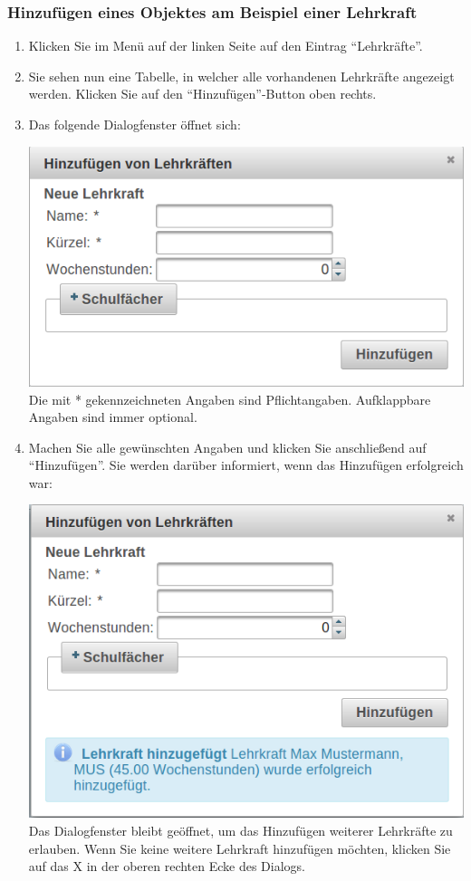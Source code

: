 \documentclass[fontsize=12pt]{scrartcl}
\begin{document}
\subsubsection{Hinzufügen eines Objektes am Beispiel einer Lehrkraft}
\begin{enumerate}
\item Klicken Sie im Menü auf der linken Seite auf den Eintrag "`Lehrkräfte"'.
\item Sie sehen nun eine Tabelle, in welcher alle vorhandenen Lehrkräfte angezeigt werden. Klicken Sie auf den "`Hinzufügen"'-Button oben rechts.
\item Das folgende Dialogfenster öffnet sich: \medskip\\
	\begin{minipage}[t]{\linewidth}
            \includegraphics[width=.8\linewidth]{images/addTeacherDialog.png}
    \medskip\\
    Die mit * gekennzeichneten Angaben sind Pflichtangaben. Aufklappbare Angaben sind immer optional.
    \end{minipage}
\clearpage
\item Machen Sie alle gewünschten Angaben und klicken Sie anschließend auf "`Hinzufügen"'. Sie werden darüber informiert, wenn das Hinzufügen erfolgreich war: \medskip\\
	\begin{minipage}[t]{\linewidth}
            \includegraphics[width=.8\linewidth]{images/addedTeacher.png}
    \medskip\\
    Das Dialogfenster bleibt geöffnet, um das Hinzufügen weiterer Lehrkräfte zu erlauben. Wenn Sie keine weitere Lehrkraft hinzufügen möchten, klicken Sie auf das X in der oberen rechten Ecke des Dialogs.
    \end{minipage}
\end{enumerate}
\end{document}
